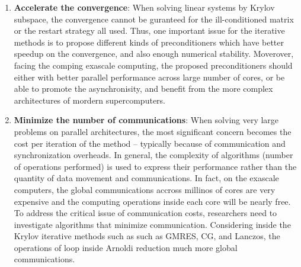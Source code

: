 \begin{enumerate}
	
	\item \textbf{Accelerate the convergence}: When solving linear systems by Krylov subspace, the convergence cannot be guranteed for the ill-conditioned matrix or the restart strategy all used. Thus, one important issue for the iterative methods is to propose different kinds of preconditioners which have better speedup on the convergence, and also enough numerical stability. Moverover, facing the comping exascale computing, the proposed preconditioners should either with better parallel performance across large number of cores, or be able to promote the asynchronisity, and benefit from the more complex architectures of mordern supercomputers. 
	
	\item \textbf{Minimize the number of communications}: When solving very large problems on parallel architectures, the most significant concern becomes the cost per iteration of the method -- typically because of communication and synchronization overheads. In general, the complexity of algorithms (number of operations performed) is used to express their performance rather than the quantity of data movement and communications. In fact, on the exascale computers, the global communications accross millinos of cores are very expensive and the computing operations inside each core will be nearly free. To address the critical issue of communication costs, researchers need to investigate algorithms that minimize communication. Considering inside the Krylov iterative methods such as such as GMRES, CG, and Lanczos, the operations of loop inside Arnoldi reduction much more global communications. 
	

\end{enumerate}
